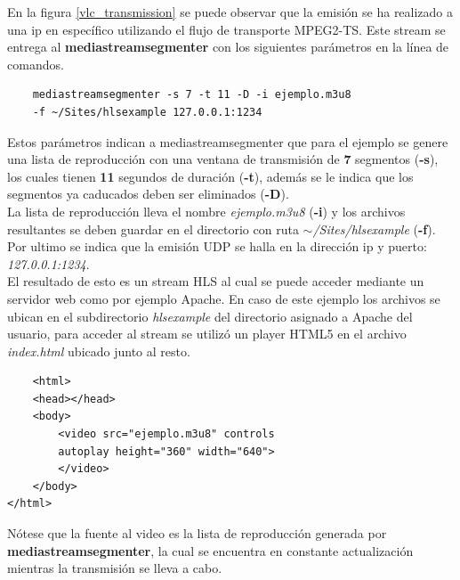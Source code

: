 En la figura \ref{vlc_transmission} se puede observar que la emisión se ha realizado a una ip en específico utilizando el flujo de transporte MPEG2-TS. Este stream se entrega al \textbf{mediastreamsegmenter} con los siguientes parámetros en la línea de comandos.

 \begin{lstlisting}
	mediastreamsegmenter -s 7 -t 11 -D -i ejemplo.m3u8 
	-f ~/Sites/hlsexample 127.0.0.1:1234
\end{lstlisting}

Estos parámetros indican a mediastreamsegmenter que para el ejemplo se genere una lista de reproducción con una ventana de transmisión de \textbf{7} segmentos (\textbf{-s}), los cuales tienen \textbf{11} segundos de duración (\textbf{-t}), además se le indica que los segmentos ya caducados deben ser eliminados (\textbf{-D}). \\

La lista de reproducción lleva el nombre \textit{ejemplo.m3u8} (\textbf{-i}) y los archivos resultantes se deben guardar en el directorio con ruta \textit{$\sim$/Sites/hlsexample} (\textbf{-f}). Por ultimo se indica que la emisión UDP se halla en la dirección ip y puerto: \textit{127.0.0.1:1234}.\\

El resultado de esto es un stream HLS al cual se puede acceder mediante un servidor web como por ejemplo Apache. En caso de este ejemplo los archivos se ubican en el subdirectorio \textit{hlsexample} del directorio asignado a Apache del usuario, para acceder al stream se utilizó un player HTML5 en el archivo \textit{index.html} ubicado junto al resto.

 \begin{lstlisting}
	<html>
	<head></head>
	<body>
		<video src="ejemplo.m3u8" controls 
		autoplay height="360" width="640">
		</video>
	</body>
</html>\end{lstlisting}

Nótese que la fuente al video es la lista de reproducción generada por \textbf{mediastreamsegmenter}, la cual se encuentra en constante actualización mientras la transmisión se lleva a cabo.\\

